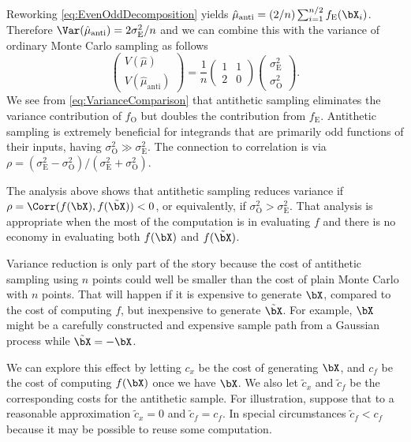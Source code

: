 Reworking \cref{eq:EvenOddDecomposition} yields \(\hat{\mu}_{\mathrm{anti}} = (2/n) \sum_{i=1}^{n/2} f_{\mathrm{E}}(\bX_i)\). Therefore \(\Var(\hat{\mu}_{\mathrm{anti}}) = 2\sigma_{\mathrm{E}}^2/n\) and we can combine this with the variance of ordinary Monte Carlo sampling as follows
\begin{equation} \label{eq:VarianceComparison}
	\begin{pmatrix} V(\hat{\mu}) \\ V(\hat{\mu}_{\mathrm{anti}}) \end{pmatrix} = \frac{1}{n} \begin{pmatrix} 1 & 1 \\ 2 & 0 \end{pmatrix} \begin{pmatrix} \sigma_{\mathrm{E}}^2 \\ \sigma_{\mathrm{O}}^2 \end{pmatrix}.
\end{equation}
We see from \cref{eq:VarianceComparison} that antithetic sampling eliminates the variance contribution of \(f_{\mathrm{O}}\) but doubles the contribution from \(f_{\mathrm{E}}\). Antithetic sampling is extremely beneficial for integrands that are primarily odd functions of their inputs, having \(\sigma_{\mathrm{O}}^2 \gg \sigma_{\mathrm{E}}^2\). The connection to correlation is via \(\rho = (\sigma_{\mathrm{E}}^2 - \sigma_{\mathrm{O}}^2)/(\sigma_{\mathrm{E}}^2 + \sigma_{\mathrm{O}}^2)\).

The analysis above shows that antithetic sampling reduces variance if \(\rho = \Corr(f(\bX), f(\tilde{\bX})) < 0\), or equivalently, if \(\sigma_{\mathrm{O}}^2 > \sigma_{\mathrm{E}}^2\). That analysis is appropriate when the most of the computation is in evaluating \(f\) and there is no economy in evaluating both \(f(\bX)\) and \(f(\tilde{\bX})\).

Variance reduction is only part of the story because the cost of antithetic sampling using \(n\) points could well be smaller than the cost of plain Monte Carlo with \(n\) points. That will happen if it is expensive to generate \(\bX\), compared to the cost of computing \(f\), but inexpensive to generate \(\tilde{\bX}\). For example, \(\bX\) might be a carefully constructed and expensive sample path from a Gaussian process while \(\tilde{\bX} = -\bX\).

We can explore this effect by letting \(c_x\) be the cost of generating \(\bX\), and \(c_f\) be the cost of computing \(f(\bX)\) once we have \(\bX\). We also let \(\tilde{c}_x\) and \(\tilde{c}_f\) be the corresponding costs for the antithetic sample. For illustration, suppose that to a reasonable approximation \(\tilde{c}_x = 0\) and \(\tilde{c}_f = c_f\). In special circumstances \(\tilde{c}_f < c_f\) because it may be possible to reuse some computation.

